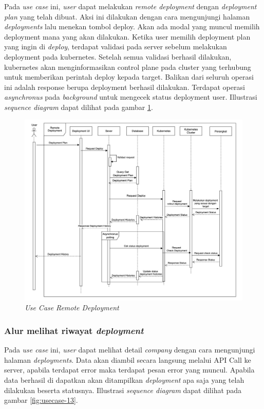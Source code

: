 Pada \textit{use case} ini, \textit{user} dapat melakukan \textit{remote deployment} dengan \textit{deployment plan} yang telah dibuat. Aksi ini dilakukan dengan cara mengunjungi halaman \textit{deployments} lalu menekan tombol deploy. Akan ada modal yang muncul memilih deployment mana yang akan dilakukan. Ketika user memilih deployment plan yang ingin di \textit{deploy}, terdapat validasi pada server sebelum melakukan deployment pada kubernetes. Setelah semua validasi berhasil dilakukan, kubernetes akan menginformasikan control plane pada cluster yang terhubung untuk memberikan perintah deploy kepada target. Balikan dari seluruh operasi ini adalah response berupa deployment berhasil dilakukan. Terdapat operasi \textit{asynchronus} pada \textit{background} untuk mengecek status deployment user. Illustrasi \textit{sequence diagram} dapat dilihat pada gambar \ref{fig:usecase-12}.


\begin{figure}[ht]
  \centering
  \includegraphics[width=1\textwidth]{resources/chapter-3/usecase/uc-12.jpg}
  \caption{\textit{Use Case} \textit{Remote Deployment}}
  \label{fig:usecase-12}
\end{figure}

\pagebreak

\subsubsection{Alur melihat riwayat \textit{deployment}}

Pada \textit{use case} ini, \textit{user} dapat melihat detail \textit{company} dengan cara mengunjungi halaman \textit{deployments}. Data akan diambil secara langsung melalui API Call ke server, apabila terdapat error maka terdapat pesan error yang muncul. Apabila data berhasil di dapatkan akan ditampilkan \textit{deployment} apa saja yang telah dilakukan beserta statusnya. Illustrasi \textit{sequence diagram} dapat dilihat pada gambar \ref{fig:usecase-13}.

